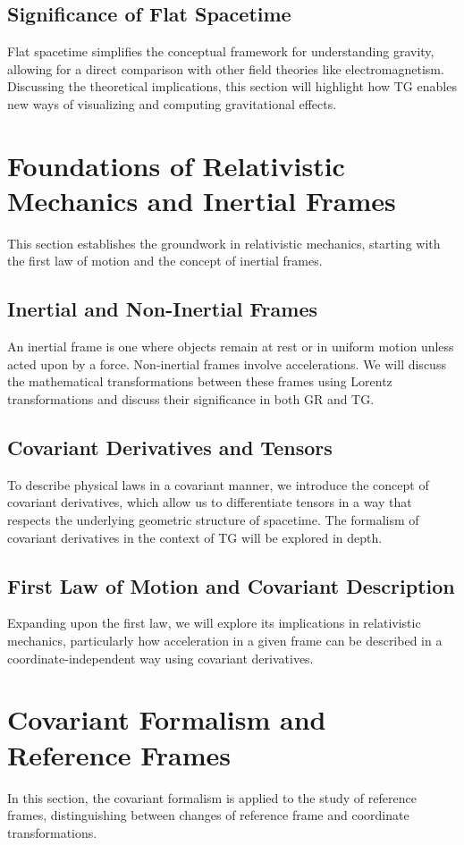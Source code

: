 \documentclass[12pt]{article}
\begin{document}
\subsection{Significance of Flat Spacetime}
Flat spacetime simplifies the conceptual framework for understanding gravity, allowing for a direct comparison with other field theories like electromagnetism. Discussing the theoretical implications, this section will highlight how TG enables new ways of visualizing and computing gravitational effects.

\section{Foundations of Relativistic Mechanics and Inertial Frames}
This section establishes the groundwork in relativistic mechanics, starting with the first law of motion and the concept of inertial frames.

\subsection{Inertial and Non-Inertial Frames}
An inertial frame is one where objects remain at rest or in uniform motion unless acted upon by a force. Non-inertial frames involve accelerations. We will discuss the mathematical transformations between these frames using Lorentz transformations and discuss their significance in both GR and TG.

\subsection{Covariant Derivatives and Tensors}
To describe physical laws in a covariant manner, we introduce the concept of covariant derivatives, which allow us to differentiate tensors in a way that respects the underlying geometric structure of spacetime. The formalism of covariant derivatives in the context of TG will be explored in depth.

\subsection{First Law of Motion and Covariant Description}
Expanding upon the first law, we will explore its implications in relativistic mechanics, particularly how acceleration in a given frame can be described in a coordinate-independent way using covariant derivatives.

\section{Covariant Formalism and Reference Frames}
In this section, the covariant formalism is applied to the study of reference frames, distinguishing between changes of reference frame and coordinate transformations.
\end{document}
